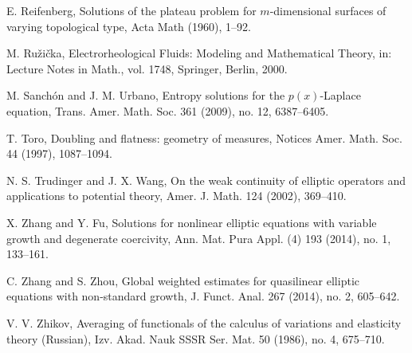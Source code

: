 \documentclass[a4paper,10pt]{amsart}
\begin{document}
\begin{thebibliography}{999}
	 E. Reifenberg, Solutions of the plateau problem for $m$-dimensional surfaces of varying topological type, Acta Math (1960), 1--92.
	
	 M. Ru\v{z}i\v{c}ka, Electrorheological Fluids: Modeling and Mathematical Theory, in: Lecture Notes in Math., vol. 1748, Springer, Berlin, 2000.
	
	
	
	
	
	
	
	 M. Sanch\'on and J. M.  Urbano, Entropy solutions for the $p(x)$-Laplace equation, Trans. Amer. Math. Soc. 361 (2009), no. 12, 6387--6405. 
	
	 T. Toro, Doubling and flatness: geometry of measures, Notices Amer. Math. Soc. 44 (1997), 1087--1094.
	
	
	  N. S. Trudinger and J. X. Wang, On the weak continuity of elliptic operators and applications  to potential theory, Amer. J. Math. 124 (2002), 369--410.
	
	 X. Zhang and Y. Fu, Solutions for nonlinear elliptic equations with variable growth and degenerate coercivity, Ann. Mat. Pura Appl. (4) 193 (2014), no. 1, 133--161. 
	
	 C. Zhang and S. Zhou, Global weighted estimates for quasilinear elliptic equations with non-standard growth, J. Funct. Anal. 267 (2014), no. 2, 605--642. 
	
	 V. V. Zhikov, Averaging of functionals of the calculus of variations and elasticity theory (Russian), Izv. Akad.	Nauk SSSR Ser. Mat. 50 (1986), no. 4, 675--710.
	
\end{thebibliography}
\end{document}
